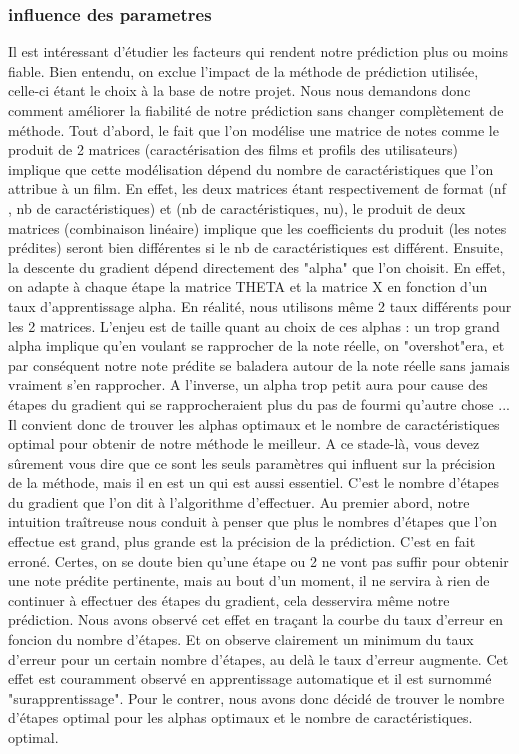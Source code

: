 \documentclass[a4paper,10pt]{article}
\begin{document}
\subsubsection{influence des parametres}
Il est intéressant d'étudier les facteurs qui rendent notre prédiction plus ou moins fiable. Bien entendu, on exclue l'impact de la méthode de prédiction utilisée, celle-ci étant le choix à la base de notre projet. Nous nous demandons donc comment améliorer la fiabilité de notre prédiction sans changer complètement de méthode. Tout d'abord, le fait que l'on modélise une matrice de notes comme le produit de 2 matrices (caractérisation des films et profils des utilisateurs) implique que cette modélisation dépend du nombre de caractéristiques que l'on attribue à un film. En effet, les deux matrices étant respectivement de format (nf , nb de caractéristiques) et (nb de caractéristiques, nu), le produit de deux matrices (combinaison linéaire) implique que les coefficients du produit (les notes prédites) seront bien différentes si le nb de caractéristiques est différent. Ensuite, la descente du gradient dépend directement des "alpha" que l'on choisit. En effet, on adapte à chaque étape la matrice THETA et la matrice X en fonction d'un taux d'apprentissage alpha. En réalité, nous utilisons même 2 taux différents pour les 2 matrices. L'enjeu est de taille quant au choix de ces alphas : un trop grand alpha implique qu'en voulant se rapprocher de la note réelle, on "overshot"era, et par conséquent notre note prédite se baladera autour de la note réelle sans jamais vraiment s'en rapprocher. A l'inverse, un alpha trop petit aura pour cause des étapes du gradient qui se rapprocheraient plus du pas de fourmi qu'autre chose ... Il convient donc de trouver les alphas optimaux et le nombre de caractéristiques optimal pour obtenir de notre méthode le meilleur. A ce stade-là, vous devez sûrement vous dire que ce sont les seuls paramètres qui influent sur la précision de la méthode, mais il en est un qui est aussi essentiel. C'est le nombre d'étapes du gradient que l'on dit à l'algorithme d'effectuer. Au premier abord, notre intuition traîtreuse nous conduit à penser que plus le nombres d'étapes que l'on effectue est grand, plus grande est la précision de la prédiction. C'est en fait erroné. Certes, on se doute bien qu'une étape ou 2 ne vont pas suffir pour obtenir une note prédite pertinente, mais au bout d'un moment, il ne servira à rien de continuer à effectuer des étapes du gradient, cela desservira même notre prédiction. Nous avons observé cet effet en traçant la courbe du taux d'erreur en foncion du nombre d'étapes. Et on observe clairement un minimum du taux d'erreur pour un certain nombre d'étapes, au delà le taux d'erreur augmente. Cet effet est couramment observé en apprentissage automatique et il est surnommé "surapprentissage". Pour le contrer, nous avons donc décidé de trouver le nombre d'étapes optimal pour les alphas optimaux et le nombre de caractéristiques. optimal. 
\end{document}
